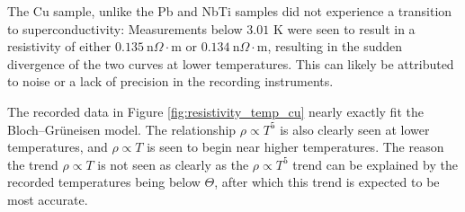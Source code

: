 \documentclass[prl,twocolumn,superscriptaddress,floatfix]{revtex4}
\begin{document}
The Cu sample, unlike the Pb and NbTi samples did not experience a transition to superconductivity:
Measurements below $3.01$ K were seen to result in a resistivity of either $0.135 \ \text{n}\Omega\cdot\text{m}$ or $0.134 \ \text{n}\Omega\cdot\text{m}$, resulting in the sudden divergence of the two curves at lower temperatures. This can likely be attributed to noise or a lack of precision in the recording instruments. 

The recorded data in Figure \ref{fig:resistivity_temp_cu} nearly exactly fit the Bloch–Grüneisen model. The relationship $\rho \propto T^5$ is also clearly seen at lower temperatures, and $\rho \propto T$ is seen to begin near higher temperatures. The reason the trend $\rho \propto T$ is not seen as clearly as the $\rho \propto T^5$ trend can be explained by the recorded temperatures being below $\Theta$, after which this trend is expected to be most accurate.
\end{document}
